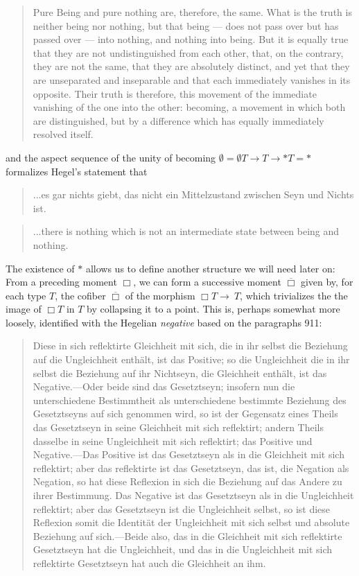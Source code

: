 \documentclass{article}
\begin{document}
\begin{quote}
    Pure Being and pure nothing are, therefore, the same. What is the truth is neither being nor nothing, but that being — does not pass over but has passed over — into nothing, and nothing into being. But it is equally true that they are not undistinguished from each other, that, on the contrary, they are not the same, that they are absolutely distinct, and yet that they are unseparated and inseparable and that each immediately vanishes in its opposite. Their truth is therefore, this movement of the immediate vanishing of the one into the other: becoming, a movement in which both are distinguished, but by a difference which has equally immediately resolved itself.
\end{quote}
    
and the aspect sequence of the unity of becoming $\emptyset = \emptyset T\rightarrow T \rightarrow * T = *$ formalizes Hegel's statement that

\begin{quote}
    ...es gar nichts giebt, das nicht ein Mittelzustand zwischen Seyn und Nichts ist.
\end{quote}

\begin{quote}
    ...there is nothing which is not an intermediate state between being and nothing.
\end{quote}

The existence of $*$ allows us to define another structure we will need later on: From a preceding moment $\Box$, we can form a successive moment $\overline{\Box}$ given by, for each type $T$, the cofiber $\overline{\Box}$ of the morphism $\Box T\rightarrow\ T$, which trivializes the the image of $\Box T$ in $T$ by collapsing it to a point. This is, perhaps somewhat more loosely, identified with the Hegelian \emph{negative} based on the paragraphs 911:

\begin{quote}
    Diese in sich reflektirte Gleichheit mit sich, die in ihr selbst die Beziehung auf die Ungleichheit enthält, ist das Positive; so die Ungleichheit die in ihr selbst die Beziehung auf ihr Nichtseyn, die Gleichheit enthält, ist das Negative.—Oder beide sind das Gesetztseyn; insofern nun die unterschiedene Bestimmtheit als unterschiedene bestimmte Beziehung des Gesetztseyns auf sich genommen wird, so ist der Gegensatz eines Theils das Gesetztseyn in seine Gleichheit mit sich reflektirt; andern Theils dasselbe in seine Ungleichheit mit sich reflektirt; das Positive und Negative.—Das Positive ist das Gesetztseyn als in die Gleichheit mit sich reflektirt; aber das reflektirte ist das Gesetztseyn, das ist, die Negation als Negation, so hat diese Reflexion in sich die Beziehung auf das Andere zu ihrer Bestimmung. Das Negative ist das Gesetztseyn als in die Ungleichheit reflektirt; aber das Gesetztseyn ist die Ungleichheit selbst, so ist diese Reflexion somit die Identität der Ungleichheit mit sich selbst und absolute Beziehung auf sich.—Beide also, das in die Gleichheit mit sich reflektirte Gesetztseyn hat die Ungleichheit, und das in die Ungleichheit mit sich reflektirte Gesetztseyn hat auch die Gleichheit an ihm.
\end{quote}
\end{document}
